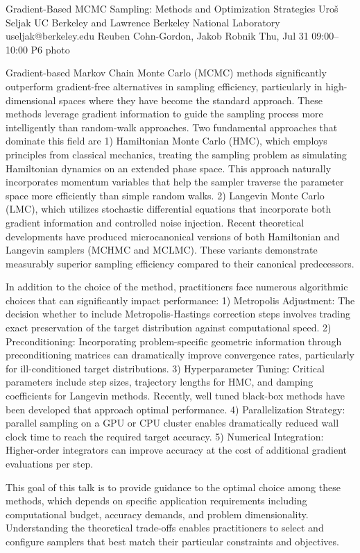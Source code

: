 \clearpage
\begin{talk}
  {Gradient-Based MCMC Sampling: Methods and Optimization Strategies}%
  {Uro\v s Seljak}%
  {UC Berkeley and Lawrence Berkeley National Laboratory}%
  {useljak@berkeley.edu}%
  {Reuben Cohn-Gordon, Jakob Robnik}%
  {}%
  {Thu, Jul 31 09:00–10:00}%
  {P6}%
  {photo}%
  
				
			
Gradient-based Markov Chain Monte Carlo (MCMC) methods significantly outperform gradient-free alternatives in sampling efficiency, particularly in high-dimensional spaces where they have become the standard approach. These methods leverage gradient information to guide the sampling process more intelligently than random-walk approaches.
Two fundamental approaches that dominate this field are 1)
Hamiltonian Monte Carlo (HMC), which  employs principles from classical mechanics, treating the sampling problem as simulating Hamiltonian dynamics on an extended phase space. This approach naturally incorporates momentum variables that help the sampler traverse the parameter space more efficiently than simple random walks. 2)
Langevin Monte Carlo (LMC), which utilizes stochastic differential equations that incorporate both gradient information and controlled noise injection. 
Recent theoretical developments have produced microcanonical versions of both Hamiltonian and Langevin samplers (MCHMC and MCLMC). These variants demonstrate measurably superior sampling efficiency compared to their canonical predecessors.

In addition to the choice of 
the method, 
practitioners face numerous algorithmic choices that can significantly impact performance:
1) Metropolis Adjustment: The decision whether to include Metropolis-Hastings correction steps involves trading exact preservation of the target distribution against computational speed.
2) Preconditioning: Incorporating problem-specific geometric information through preconditioning matrices can dramatically improve convergence rates, particularly for ill-conditioned target distributions.
3) Hyperparameter Tuning: Critical parameters include step sizes, trajectory lengths for HMC, and damping coefficients for Langevin methods. Recently, well tuned black-box methods have been developed that approach optimal performance. 
4) Parallelization Strategy: parallel sampling on a GPU or CPU cluster enables dramatically reduced wall clock time to reach the required target accuracy. 
5) Numerical Integration: Higher-order integrators can improve accuracy at the cost of additional gradient evaluations per step.

This goal of this talk is to provide
guidance to 
the optimal choice among these methods, which depends on specific application requirements including computational budget, accuracy demands, and problem dimensionality. Understanding the theoretical trade-offs enables practitioners to select and configure samplers that best match their particular constraints and objectives.


\end{talk}

